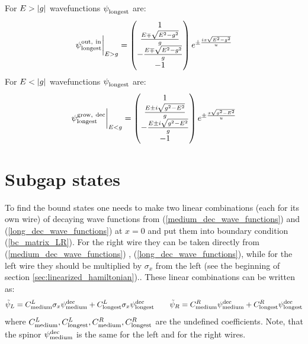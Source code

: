 For $ E>\left|g\right| $ wavefunctions $ \psi_{\mathrm{longest}}^{\mathrm{}}$ are:
\begin{gather}
\label{long_prop_wave_functions}
		\psi_{\mathrm{longest}}^{\mathrm{out,~in}}
		\bigg|_{E>g}
=
\begin{pmatrix}
1\\
\frac{E\mp \sqrt{E^2-g^2}}{g}\\
-\frac{E\mp \sqrt{E^2-g^2}}{g}\\
-1
\end{pmatrix}
e^{\pm\frac{ix\sqrt{E^2-g^2}}{u}}
\end{gather}
For $ E<\left|g\right| $ wavefunctions $ \psi_{\mathrm{longest}}^{\mathrm{}}	 $ are:
\begin{gather}
	\label{long_dec_wave_functions}
	\psi_{\mathrm{longest}}^{\mathrm{grow,~dec}} 
	\bigg|_{E<g}
	=
	\begin{pmatrix}
	1\\
	\frac{E\pm i\sqrt{g^2-E^2}}{g}\\
	-\frac{E\pm i\sqrt{g^2-E^2}}{g}\\
	-1
	\end{pmatrix}
	e^{\pm\frac{x\sqrt{g^2-E^2}}{u}}
\end{gather}

\section{Subgap states}
\label{sec:Subgap_states}

To find the bound states one needs to make two linear combinations (each for its own wire) of decaying wave functions from (\ref{medium_dec_wave_functions}) and (\ref{long_dec_wave_functions}) at $ x=0 $ and put them into boundary condition (\ref{bc_matrix_LR}). For the right wire they can be taken directly from (\ref{medium_dec_wave_functions}) , (\ref{long_dec_wave_functions}), while for the left wire they should be multiplied by $ \sigma_x $ from the left (see the beginning of section \ref{sec:linearized_hamiltonian}).. These linear combinations can be written as:
\begin{gather}
	\tilde{\psi}_L
	=
	C_{\mathrm{medium}}^L
	\sigma_x 
	\psi_{\mathrm{medium}}^{\mathrm{dec}} 
	+
	C_{\mathrm{longest}}^L
	\sigma_x
	 \psi_{\mathrm{longest}}^{\mathrm{dec}} 
\qquad
	\tilde{\psi}_R
	=
	C_{\mathrm{medium}}^R
	\psi_{\mathrm{medium}}^{\mathrm{dec}} 
	+
	C_{\mathrm{longest}}^R
	\psi_{\mathrm{longest}}^{\mathrm{dec}} 
\end{gather}
where $ C_{\mathrm{medium}}^L,C_{\mathrm{longest}}^L, C_{\mathrm{medium}}^R,C_{\mathrm{longest}}^R $ are the undefined coefficients. Note, that the spinor $ \psi_{\mathrm{medium}}^{\mathrm{dec}} $ is the same for the left and for the right wires.

